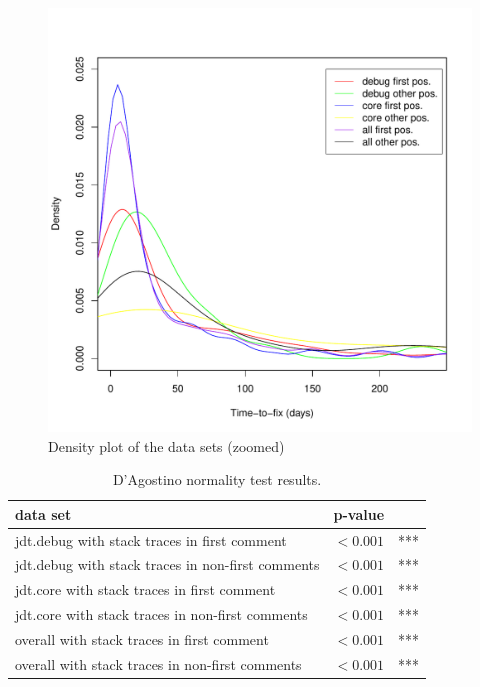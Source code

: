 \begin{figure}[!ht]
	\centering
		\includegraphics[width=1\textwidth]{img/ttf_stacktrace_pos_density.pdf}
	\caption{Density plot of the data sets (zoomed)}
	\label{fig:ttf_pos_stats_density}
\end{figure}

\begin{table}[!ht]\footnotesize
	\centering
	\begin{tabular}{lrl}
		\toprule
		data set & p-value & \\
		\midrule
		jdt.debug with stack traces in first comment & $< 0.001$ & *** \\
		jdt.debug with stack traces in non-first comments & $< 0.001$ & *** \\
		jdt.core with stack traces in first comment & $< 0.001$ & *** \\
		jdt.core with stack traces in non-first comments & $< 0.001$ & *** \\
		overall with stack traces in first comment & $< 0.001$ & *** \\
		overall with stack traces in non-first comments & $< 0.001$ & *** \\
		\bottomrule
	\end{tabular} 
	\caption{D'Agostino normality test results.}
	\label{tab:pos_dagistino}
\end{table}



